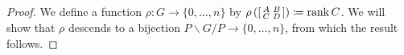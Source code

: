 \begin{proof}


    We define a function $\rho\colon G\to\{0,\ldots,n\}$ by $\rho\left(\begin{bsmallmatrix}
        A & B \\ C & D
    \end{bsmallmatrix}\right)\coloneqq\operatorname{rank}C$. We will show that $\rho$ descends to a bijection $P\backslash G/P\to\{0,\ldots,n\}$, from which the result follows.
    

\end{proof}
